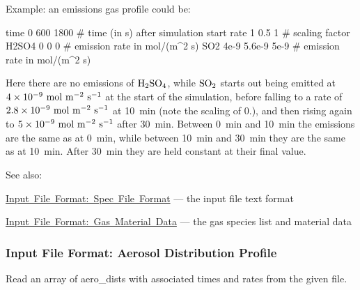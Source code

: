 Example\+: an emissions gas profile could be\+: 
\begin{DoxyPre}
 time   0       600     1800    \# time (in s) after simulation start
 rate   1       0.5     1       \# scaling factor
 H2SO4  0       0       0       \# emission rate in mol/(m^2 s)
 SO2    4e-9    5.6e-9  5e-9    \# emission rate in mol/(m^2 s)
 \end{DoxyPre}
 Here there are no emissions of $\rm H_2SO_4$, while $\rm SO_2$ starts out being emitted at $4\times 10^{-9}\rm\ mol\ m^{-2}\ s^{-1}$ at the start of the simulation, before falling to a rate of $2.8\times 10^{-9}\rm\ mol\ m^{-2}\ s^{-1}$ at 10~min (note the scaling of 0.), and then rising again to $5\times 10^{-9}\rm\ mol\ m^{-2}\ s^{-1}$ after 30~min. Between 0~min and 10~min the emissions are the same as at 0~min, while between 10~min and 30~min they are the same as at 10~min. After 30~min they are held constant at their final value.

See also\+:
\begin{DoxyItemize}
\item \mbox{\hyperlink{spec_file_format}{Input File Format\+: Spec File Format}} --- the input file text format
\item \mbox{\hyperlink{input_format_gas_data}{Input File Format\+: Gas Material Data}} --- the gas species list and material data 
\end{DoxyItemize}\hypertarget{input_format_aero_dist_profile}{}\subsubsection{Input File Format\+: Aerosol Distribution Profile}\label{input_format_aero_dist_profile}
Read an array of aero\+\_\+dists with associated times and rates from the given file.


